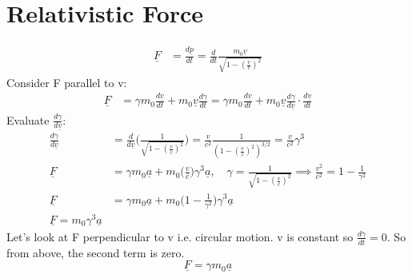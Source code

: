 \documentclass[a4paper, 11pt, normalem]{report}
\begin{document}
\section{Relativistic Force}
\begin{align}
    \underline{F} &= \frac{d\underline{p}}{dt} = \frac{d}{dt}\frac{m_{0}\underline{v}}{\sqrt{1 - (\tfrac{v}{c})^{2}}}
\end{align}
Consider F parallel to v:
\begin{align}
    \underline{F} &= \gamma m_{0}\frac{d\underline{v}}{dt} + m_{0}\underline{v}\frac{d\gamma}{dt} = \gamma m_{0}\frac{d\underline{v}}{dt} + m_{0}\underline{v}\frac{d\gamma}{d\underline{v}}\cdot\frac{d\underline{v}}{dt}
\end{align}
Evaluate $\frac{d\gamma}{d\underline{v}}$:
\begin{align}
    \frac{d\gamma}{d\underline{v}} &= \frac{d}{d\underline{v}}\Big(\frac{1}{\sqrt{1 - (\tfrac{v}{c})^{2}}}\Big) = \frac{v}{c^{2}}\frac{1}{(1 - (\tfrac{v}{c})^{2})^{3/2}} = \frac{v}{c^{2}}\gamma^{3} \\
    \underline{F} &= \gamma m_{0}\underline{a} + m_{0}\Big(\frac{v}{c}\Big)\gamma^{3}\underline{a},\quad \gamma = \frac{1}{\sqrt{1 - (\tfrac{v}{c})^{2}}} \implies \frac{v^{2}}{c^{2}} = 1 - \frac{1}{\gamma^{2}} \\
    \underline{F} &= \gamma m_{0}\underline{a} + m_{0}\Big(1 - \frac{1}{\gamma^{2}}\Big)\gamma^{3}\underline{a} \\
    \underline{F} = m_{0}\gamma^{3}\underline{a}
\end{align}
Let's look at F perpendicular to v i.e. circular motion.
v is constant so $\frac{d\gamma}{dt} = 0$.
So from above, the second term is zero.
\begin{equation}
    \underline{F} = \gamma m_{0}\underline{a}
\end{equation}
\end{document}
